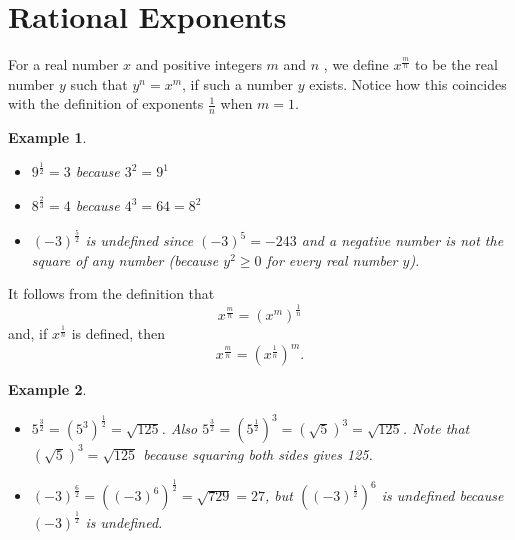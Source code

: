 \documentclass[11pt]{book}               %
\newtheorem{example}{Example}
\begin{document}
%
%

\newpage
\section{Rational Exponents}

For a real number $x$ and positive integers $m$ and $n$ , we define $x^{\frac{m}{n}}$ to be the real number $y$ such that $y^n = x^m$, if such a number $y$ exists.  Notice how this coincides with the definition of exponents $\frac{1}{n}$ when $m = 1$.

\begin{example}
$ $ \normalfont
\begin{itemize}
\item $9^\frac{1}{2} = 3$ because $3^2 = 9^1$
\item $8^\frac{2}{3} = 4$ because $4^3 = 64 = 8^2$
\item $(-3)^\frac{5}{2}$ is undefined since $(-3)^5 = -243$ and a negative number is not the square of any number (because $y^2 \geq 0$ for every real number $y$).
\end{itemize}
\end{example}


It follows from the definition that 
$$x^\frac{m}{n} = \left(x^m\right)^\frac{1}{n}$$
and, if $x^\frac{1}{n}$ is defined, then 
$$x^\frac{m}{n} = \left(x^\frac{1}{n}\right)^m.$$



\begin{example}
$ $
\normalfont
\begin{itemize}
\item $5^\frac{3}{2} = \left(5^3\right)^\frac{1}{2} = \sqrt{125}$.  Also 
$5^\frac{3}{2} = \left(5^\frac{1}{2}\right)^3 = \left(\sqrt{5}\right)^3 = \sqrt{125}$.  Note that $\left(\sqrt{5}\right)^3 = \sqrt{125}$ because squaring both sides gives 125.

\item $\left(-3\right)^\frac{6}{2} = \left(\left(-3\right)^6\right)^\frac{1}{2} = \sqrt{729} = 27$, but 
 $\left(\left(-3\right)^\frac{1}{2}\right)^6$ is undefined because $\left(-3\right)^\frac{1}{2}$ is undefined.
\end{itemize}
\label{ex2}
\end{example}
\end{document}
